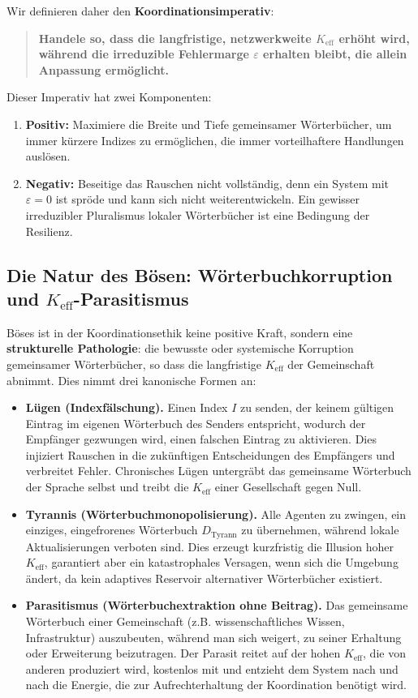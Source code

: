 \documentclass[12pt,a4paper]{article}
\begin{document}
Wir definieren daher den \textbf{Koordinationsimperativ}:

\begin{quote}
	\textbf{Handele so, dass die langfristige, netzwerkweite \(K_{\mathrm{eff}}\) erhöht wird, während die irreduzible Fehlermarge \(\varepsilon\) erhalten bleibt, die allein Anpassung ermöglicht.}
\end{quote}

Dieser Imperativ hat zwei Komponenten:
\begin{enumerate}[leftmargin=*]
	\item \textbf{Positiv:} Maximiere die Breite und Tiefe gemeinsamer Wörterbücher, um immer kürzere Indizes zu ermöglichen, die immer vorteilhaftere Handlungen auslösen.
	\item \textbf{Negativ:} Beseitige das Rauschen nicht vollständig, denn ein System mit \(\varepsilon = 0\) ist spröde und kann sich nicht weiterentwickeln. Ein gewisser irreduzibler Pluralismus lokaler Wörterbücher ist eine Bedingung der Resilienz.
\end{enumerate}

\subsection{Die Natur des Bösen: Wörterbuchkorruption und \(K_{\mathrm{eff}}\)-Parasitismus}

Böses ist in der Koordinationsethik keine positive Kraft, sondern eine \textbf{strukturelle Pathologie}: die bewusste oder systemische Korruption gemeinsamer Wörterbücher, so dass die langfristige \(K_{\mathrm{eff}}\) der Gemeinschaft abnimmt. Dies nimmt drei kanonische Formen an:

\begin{itemize}[leftmargin=*]
	\item \textbf{Lügen (Indexfälschung).} Einen Index \(I\) zu senden, der keinem gültigen Eintrag im eigenen Wörterbuch des Senders entspricht, wodurch der Empfänger gezwungen wird, einen falschen Eintrag zu aktivieren. Dies injiziert Rauschen in die zukünftigen Entscheidungen des Empfängers und verbreitet Fehler. Chronisches Lügen untergräbt das gemeinsame Wörterbuch der Sprache selbst und treibt die \(K_{\mathrm{eff}}\) einer Gesellschaft gegen Null.
	\item \textbf{Tyrannis (Wörterbuchmonopolisierung).} Alle Agenten zu zwingen, ein einziges, eingefrorenes Wörterbuch \(D_{\text{Tyrann}}\) zu übernehmen, während lokale Aktualisierungen verboten sind. Dies erzeugt kurzfristig die Illusion hoher \(K_{\mathrm{eff}}\), garantiert aber ein katastrophales Versagen, wenn sich die Umgebung ändert, da kein adaptives Reservoir alternativer Wörterbücher existiert.
	\item \textbf{Parasitismus (Wörterbuchextraktion ohne Beitrag).} Das gemeinsame Wörterbuch einer Gemeinschaft (z.B. wissenschaftliches Wissen, Infrastruktur) auszubeuten, während man sich weigert, zu seiner Erhaltung oder Erweiterung beizutragen. Der Parasit reitet auf der hohen \(K_{\mathrm{eff}}\), die von anderen produziert wird, kostenlos mit und entzieht dem System nach und nach die Energie, die zur Aufrechterhaltung der Koordination benötigt wird.
\end{itemize}
\end{document}
